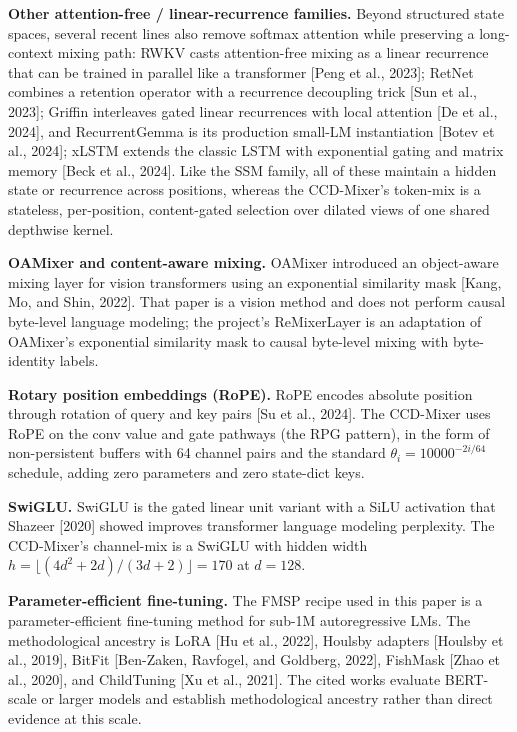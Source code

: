 \documentclass[11pt]{article}
\begin{document}
\textbf{Other attention-free / linear-recurrence families.} Beyond structured state spaces, several recent lines also remove softmax attention while preserving a long-context mixing path: RWKV casts attention-free mixing as a linear recurrence that can be trained in parallel like a transformer [Peng et al., 2023]; RetNet combines a retention operator with a recurrence decoupling trick [Sun et al., 2023]; Griffin interleaves gated linear recurrences with local attention [De et al., 2024], and RecurrentGemma is its production small-LM instantiation [Botev et al., 2024]; xLSTM extends the classic LSTM with exponential gating and matrix memory [Beck et al., 2024]. Like the SSM family, all of these maintain a hidden state or recurrence across positions, whereas the CCD-Mixer's token-mix is a stateless, per-position, content-gated selection over dilated views of one shared depthwise kernel.

\textbf{OAMixer and content-aware mixing.} OAMixer introduced an object-aware mixing layer for vision transformers using an exponential similarity mask [Kang, Mo, and Shin, 2022]. That paper is a vision method and does not perform causal byte-level language modeling; the project's ReMixerLayer is an adaptation of OAMixer's exponential similarity mask to causal byte-level mixing with byte-identity labels.

\textbf{Rotary position embeddings (RoPE).} RoPE encodes absolute position through rotation of query and key pairs [Su et al., 2024]. The CCD-Mixer uses RoPE on the conv value and gate pathways (the RPG pattern), in the form of non-persistent buffers with 64 channel pairs and the standard $\theta_i = 10000^{-2i/64}$ schedule, adding zero parameters and zero state-dict keys.

\textbf{SwiGLU.} SwiGLU is the gated linear unit variant with a SiLU activation that Shazeer [2020] showed improves transformer language modeling perplexity. The CCD-Mixer's channel-mix is a SwiGLU with hidden width $h = \lfloor (4d^2 + 2d) / (3d + 2) \rfloor = 170$ at $d=128$.

\textbf{Parameter-efficient fine-tuning.} The FMSP recipe used in this paper is a parameter-efficient fine-tuning method for sub-1M autoregressive LMs. The methodological ancestry is LoRA [Hu et al., 2022], Houlsby adapters [Houlsby et al., 2019], BitFit [Ben-Zaken, Ravfogel, and Goldberg, 2022], FishMask [Zhao et al., 2020], and ChildTuning [Xu et al., 2021]. The cited works evaluate BERT-scale or larger models and establish methodological ancestry rather than direct evidence at this scale.
\end{document}
